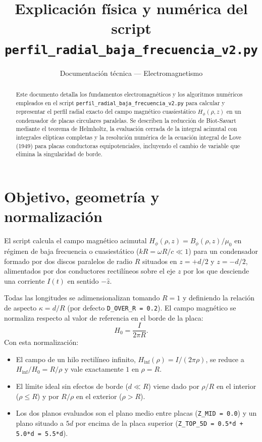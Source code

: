 \documentclass[11pt]{article}
\title{\textbf{\color{accentblue}Explicación física y numérica del script \texttt{perfil\_radial\_baja\_frecuencia\_v2.py}}}
\author{Documentación técnica --- Electromagnetismo}
\date{}
\begin{document}
\maketitle

\begin{abstract}
Este documento detalla los fundamentos electromagnéticos y los algoritmos numéricos empleados en el script \texttt{perfil\_\allowbreak radial\_\allowbreak baja\_\allowbreak frecuencia\_\allowbreak v2.py} para calcular y representar el perfil radial exacto del campo magnético cuasiestático $H_\phi(\rho, z)$ en un condensador de placas circulares paralelas. Se describen la reducción de Biot-Savart mediante el teorema de Helmholtz, la evaluación cerrada de la integral acimutal con integrales elípticas completas y la resolución numérica de la ecuación integral de Love (1949) para placas conductoras equipotenciales, incluyendo el cambio de variable que elimina la singularidad de borde.
\end{abstract}

\tableofcontents
\vspace{0.4cm}

\section{Objetivo, geometría y normalización}

El script calcula el campo magnético acimutal $H_\phi(\rho, z) = B_\phi(\rho, z)/\mu_0$ en régimen de baja frecuencia o cuasiestático ($kR = \omega R / c \ll 1$) para un condensador formado por dos discos paralelos de radio $R$ situados en $z = +d/2$ y $z = -d/2$, alimentados por dos conductores rectilíneos sobre el eje $z$ por los que desciende una corriente $I(t)$ en sentido $-\hat{z}$.

Todas las longitudes se adimensionalizan tomando $R = 1$ y definiendo la relación de aspecto $\kappa = d/R$ (por defecto \texttt{D\_OVER\_R = 0.2}). El campo magnético se normaliza respecto al valor de referencia en el borde de la placa:
\begin{equation}
    H_0 = \frac{I}{2\pi R}.
\end{equation}
Con esta normalización:
\begin{itemize}
    \item El campo de un hilo rectilíneo infinito, $H_{\mathrm{inf}}(\rho) = I / (2\pi\rho)$, se reduce a $H_{\mathrm{inf}}/H_0 = R/\rho$ y vale exactamente $1$ en $\rho = R$.
    \item El límite ideal sin efectos de borde ($d \ll R$) viene dado por $\rho/R$ en el interior ($\rho \le R$) y por $R/\rho$ en el exterior ($\rho > R$).
    \item Los dos planos evaluados son el plano medio entre placas (\texttt{Z\_MID = 0.0}) y un plano situado a $5d$ por encima de la placa superior (\texttt{Z\_TOP\_5D = 0.5*d + 5.0*d = 5.5*d}).
\end{itemize}
\end{document}
